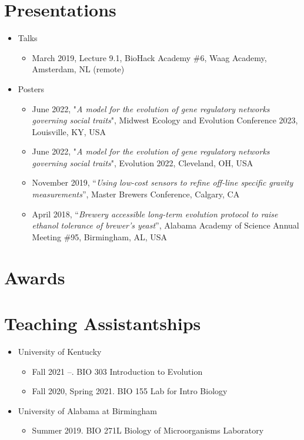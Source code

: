 \documentclass[11pt]{article}
\begin{document}
    \section*{Presentations}
        \begin{itemize}[leftmargin=.25in]
            \item Talks
                \begin{itemize}
                    \item March 2019, Lecture 9.1, BioHack Academy \#6, Waag Academy, Amsterdam, NL (remote)
                \end{itemize}
            \item Posters
                \begin{itemize}
                    \item June 2022, "{\it A model for the evolution of gene regulatory networks governing social traits}", Midwest Ecology and Evolution Conference 2023, Louisville, KY, USA 
                    \item June 2022, "{\it A model for the evolution of gene regulatory networks governing social traits}", Evolution 2022, Cleveland, OH, USA 
                    \item November 2019, “{\it Using low-cost sensors to refine off-line specific gravity measurements}”, Master Brewers Conference, Calgary, CA
                    \item April 2018, “{\it Brewery accessible long-term evolution protocol to raise ethanol tolerance of brewer’s yeast}”, Alabama Academy of Science Annual Meeting \#95, Birmingham, AL, USA
                \end{itemize}
        \end{itemize}


    \section*{Awards}


    \section*{Teaching Assistantships}
        \begin{itemize}[leftmargin=.25in]
            \item University of Kentucky
                \begin{itemize}
                \item Fall 2021 --. BIO 303 Introduction to Evolution
                \item Fall 2020, Spring 2021. BIO 155 Lab for Intro Biology
                \end{itemize}
            \item University of Alabama at Birmingham
                \begin{itemize}
                \item Summer 2019. BIO 271L Biology of Microorganisms Laboratory
                \end{itemize}
        \end{itemize}
\end{document}
